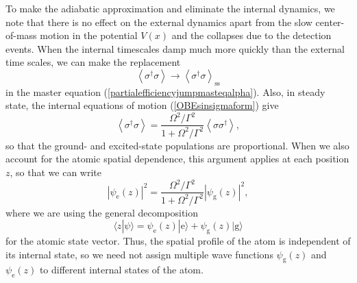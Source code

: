 \documentclass[12pt,aps,onecolum,superscriptaddress,footinbib,floatfix,showpacs]{revtex4-1}
\def\ket#1{|{#1}\rangle}
\def\expct#1{\!\left\langle{#1}\right\rangle}
\def\ss{_{\mathrm{ss}}}
\begin{document}
To make the adiabatic approximation and eliminate the internal dynamics,
we note that there is no effect on the external dynamics apart
from the slow center-of-mass motion in the potential $V(x)$ and
the collapses due to the detection events.
When the internal timescales damp much more quickly than the external
time scales, we can make the replacement
\begin{equation}
  \expct{\sigma^\dagger\sigma}\longrightarrow
  \expct{\sigma^\dagger\sigma}\ss
\end{equation}
in the master equation (\ref{partialefficiencyjumpmasteqalpha}).
Also, in steady state, the internal equations of motion
(\ref{OBEsinsigmaform})
give
\begin{equation}
  \expct{\sigma^\dagger\sigma} 
   = \frac{\Omega^2/\Gamma^2}{1+\Omega^2/\Gamma^2}
  \expct{\sigma\sigma^\dagger},
\end{equation}
so that the ground- and excited-state populations are proportional.
When we also account for the atomic spatial dependence,
this argument applies at each position $z$, so that we can
write
\begin{equation}
  |\psi_\mathrm{e}(z)|^2
   = \frac{\Omega^2/\Gamma^2}{1+\Omega^2/\Gamma^2}
  |\psi_\mathrm{g}(z)|^2,
\end{equation}
where we are using the general decomposition 
\begin{equation}
  \langle z|\psi\rangle = \psi_\mathrm{e}(z)\ket{\mathrm{e}} + 
    \psi_\mathrm{g}(z)\ket{\mathrm{g}}
  \label{egequiv}
\end{equation}
for the atomic state vector.
Thus, the spatial profile of the atom is independent of its internal state,
so we need not assign multiple wave functions
$\psi_\mathrm{g}(z)$ and $\psi_\mathrm{e}(z)$ 
to different internal states of the atom.
\end{document}
